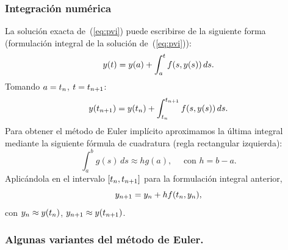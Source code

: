 \subsubsection*{Integración numérica}
La solución exacta de~(\ref{eq:pvi}) puede escribirse de la siguiente
forma (formulación integral de la solución de~(\ref{eq:pvi})):
\begin{equation*}
  y(t) = y(a) + \int_a^t f(s,y(s))\, ds.
\end{equation*}
Tomando $a={t_n}$, $t={t_{n+1}}$:
\begin{equation*}
  y({t_{n+1}}) = y({t_n}) + \int_{t_n}^{t_{n+1}} f(s,y(s))\, ds.
\end{equation*}
Para obtener el método de Euler implícito aproximamos la última
integral mediante la siguiente fórmula de cuadratura (regla
rectangular izquierda):
\begin{equation*}
  \int_a^b g(s)\,ds \approx hg(a), \quad \text{ con $h=b-a$}.
\end{equation*}
Aplicándola en el intervalo $[{t_n},{t_{n+1}}]$ para la formulación integral
anterior,
\begin{equation*}
  {y_{n+1}} =  {y_n} + h f({t_n},{y_n}),
\end{equation*}
con ${y_n}\approx y({t_n})$, ${y_{n+1}}\approx y({t_{n+1}})$.

\subsubsection*{Algunas variantes del método de Euler.}

